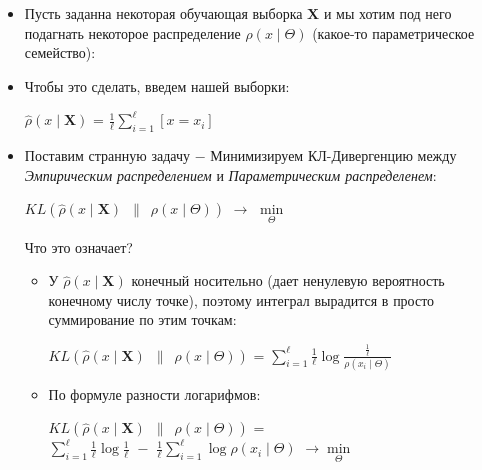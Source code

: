         \begin{itemize}
            \item Пусть заданна некоторая обучающая выборка $\mathbf{X}$ и мы хотим под него подагнать некоторое распределение $\rho (x \mid \Theta)$ (какое-то параметрическое семейство):
            

            \item Чтобы это сделать, введем  нашей выборки:
            \begin{center}
                \Large
                $\hat{\rho} (x \mid \mathbf{X})$ = $\frac{1}{\ell}\sum\limits_{i = 1}^\ell [x = x_i]$
            \end{center}


            \item Поставим странную задачу $-$ Минимизируем КЛ-Дивергенцию между \textit{Эмпирическим распределением} и \textit{Параметрическим распределенем}:
            \begin{center}
                \Large
                \colorbox{green!20}{
                $KL(\hat{\rho} (x \mid \mathbf{X}) \,\,\, \| \,\,\, \rho (x \mid \Theta) )$ $\longrightarrow$ $\min\limits_\Theta$}
            \end{center}

            Что это означает?
            \begin{itemize}
                \item У $\hat{\rho} (x \mid \mathbf{X})$ конечный носительно (дает ненулевую вероятность конечному числу точке), поэтому интеграл вырадится в просто суммирование по этим точкам:
                \begin{center}
                    \Large
                    
                    $KL(\hat{\rho} (x \mid \mathbf{X}) \,\,\, \| \,\,\, \rho (x \mid \Theta) )$ = $\sum\limits_{i = 1}^\ell \frac{1}{\ell} \log \frac{\frac{1}{\ell}}{ \rho (x_i \mid \Theta) }$
                \end{center}

                \item По формуле разности логарифмов:
                \begin{center}
                    \Large
                    $KL(\hat{\rho} (x \mid \mathbf{X}) \,\,\, \| \,\,\, \rho (x \mid \Theta) )$ = $\sum\limits_{i = 1}^\ell \frac{1}{\ell} \log \frac{1}{\ell}  \,\, - \,\, \frac{1}{\ell} \sum\limits_{i = 1}^\ell \log \rho(x_i \mid \Theta )$ $\longrightarrow \min\limits_\Theta$
                \end{center}


\end{itemize}
\end{itemize}
